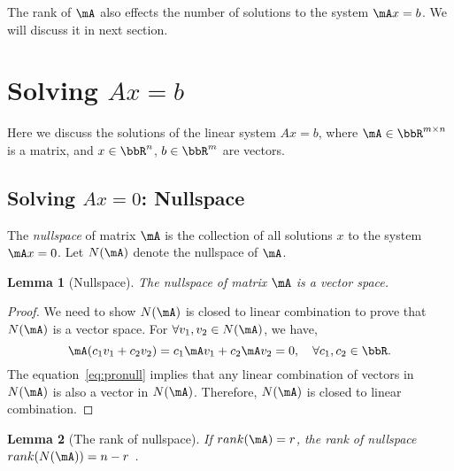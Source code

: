 \documentclass[11pt]{article}
\theoremstyle{plain}
\newtheorem{lem}{Lemma}
\theoremstyle{definition}
\begin{document}
The rank of $\mA$ also effects the number of solutions to the system $\mA x = b$. We will discuss it in next section.

\section{Solving $Ax = b$}

Here we discuss the solutions of the linear system $Ax = b$, where $\mA \in \bbR^{m \times n}$ is a matrix, and $x \in \bbR^n$, $b \in \bbR^m$ are vectors.

\subsection{Solving $Ax = 0$: Nullspace}
The \textit{nullspace} of matrix $\mA$ is the collection of all solutions $x$ to the system $\mA x = 0$. Let $N(\mA)$ denote the nullspace of $\mA$.

\vspace{.2cm}

\begin{lem}[Nullspace] 
The \textit{nullspace} of matrix $\mA$ is a vector space. 
\end{lem}

\begin{proof}
We need to show $N(\mA)$ is closed to linear combination to prove that $N(\mA)$ is a vector space. For $\forall v_1, v_2 \in N(\mA)$, we have,
\begin{equation}\label{eq:pronull}
	\mA(c_1 v_1 + c_2 v_2) = c_1 \mA v_1 +  c_2 \mA v_2 = 0, \quad \forall  c_1, c_2 \in \bbR.
\end{equation}
The equation~\eqref{eq:pronull} implies that any linear combination of vectors in $N(\mA)$ is also a vector in $N(\mA)$. Therefore, $N(\mA)$ is closed to linear combination.
\end{proof}

\begin{lem}[The rank of nullspace]\label{lem:ranknull}
If  $rank(\mA) = r$, the rank of nullspace $rank(N(\mA)) = n-r$ .
\end{lem}
\end{document}
